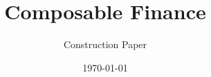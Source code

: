 \documentclass{article}
\title{Composable Finance}
\author{Construction Paper}
\date{\monthyeardate\today}
\begin{document}
\maketitle
\tableofcontents
\pagebreak

\pagebreak

\pagebreak


\pagebreak

% 
% 

% 
\pagebreak

\pagebreak



\end{document}
